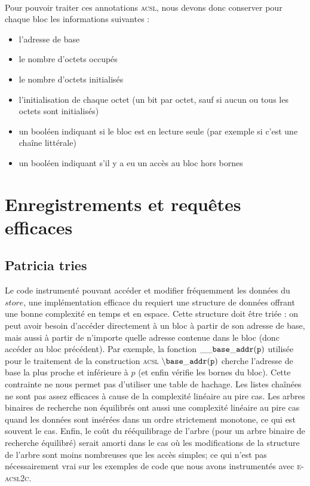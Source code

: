 ~\\
Pour pouvoir traiter ces annotations \textsc{acsl}, nous devons donc conserver
pour chaque bloc les informations suivantes :
\begin{itemize}
\item l'adresse de base
\item le nombre d'octets occupés
\item le nombre d'octets initialisés
\item l'initialisation de chaque octet (un bit par octet, sauf si aucun ou tous
  les octets sont initialisés)
\item un booléen indiquant si le bloc est en lecture seule (par exemple si c'est
  une chaîne littérale)
\item un booléen indiquant s'il y a eu un accès au bloc hors bornes
\end{itemize}







\section{Enregistrements et requêtes efficaces}


\subsection{Patricia tries}

Le code instrumenté pouvant accéder et modifier fréquemment les données du
$store$, une implémentation efficace du requiert une structure de données
offrant une bonne complexité en temps et en espace. Cette structure doit être
triée : on peut avoir besoin d'accéder directement à un bloc à partir de son
adresse de base, mais aussi à partir de n'importe quelle adresse contenue dans
le bloc (donc accéder au bloc précédent). Par exemple, la fonction
${\tt \_\_base\_addr(p)}$ utilisée pour le traitement de la construction
\textsc{acsl} ${\tt \backslash base\_addr(p)}$ cherche l'adresse de base la plus
proche et inférieure à $p$ (et enfin vérifie les bornes du bloc). Cette
contrainte ne nous permet pas d'utiliser une table de hachage. Les listes
chaînées ne sont pas assez efficaces à cause de la complexité linéaire au pire
cas. Les arbres binaires de recherche non équilibrés ont aussi une complexité
linéaire au pire cas quand les données sont insérées dans un ordre strictement
monotone, ce qui est souvent le cas. Enfin, le coût du rééquilibrage de l'arbre
(pour un arbre binaire de recherche équilibré) serait amorti dans le cas où les
modifications de la structure de l'arbre sont moins nombreuses que les accès
simples; ce qui n'est pas nécessairement vrai sur les exemples de code que nous
avons instrumentés avec \textsc{e-acsl2c}.

